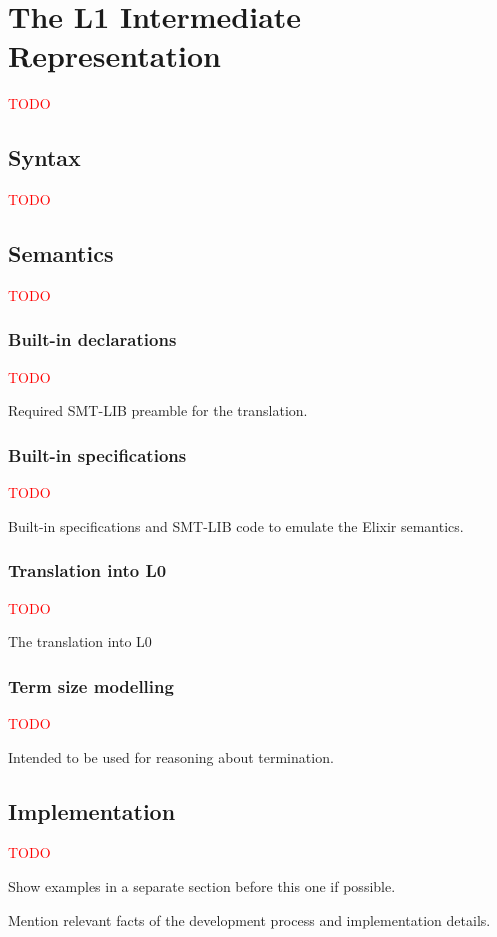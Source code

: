 \chapter{The L1 Intermediate Representation}
\label{cap:intermediateRepresentation}


\textcolor{red}{TODO}

\section{Syntax}

\textcolor{red}{TODO}

\section{Semantics}

\textcolor{red}{TODO}

\subsection{Built-in declarations}

\textcolor{red}{TODO}

Required SMT-LIB preamble for the translation.

\subsection{Built-in specifications}

\textcolor{red}{TODO}

Built-in specifications and SMT-LIB code to emulate the 
Elixir semantics.

\subsection{Translation into L0}

\textcolor{red}{TODO}

The translation into L0

\subsection{Term size modelling}

\textcolor{red}{TODO}

Intended to be used for reasoning about termination.

\section{Implementation}

\textcolor{red}{TODO}

Show examples in a separate section before this one if possible.

Mention relevant facts of the development process and implementation details.
